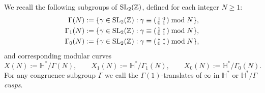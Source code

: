 \documentclass[11pt]{article}
\renewcommand{\H}{\mathbb{H}}
\newcommand{\Z}{\mathbb{Z}}
\newcommand{\SL}{{\rm SL}}
\theoremstyle{definition}
\begin{document}
We recall the following subgroups of $\SL_2(\Z)$, defined for each integer $N\ge 1$:
\begin{align*}
\Gamma(N)&:=\{\gamma\in \SL_2(\Z):\gamma\equiv \left(\begin{smallmatrix}1&0\\0&1\end{smallmatrix}\right)\bmod N\},\\
\Gamma_1(N)&:=\{\gamma\in \SL_2(\Z):\gamma\equiv \left(\begin{smallmatrix}1&*\\0&1\end{smallmatrix}\right)\bmod N\},\\
\Gamma_0(N)&:=\{\gamma\in \SL_2(\Z):\gamma\equiv \left(\begin{smallmatrix}*&*\\0&*\end{smallmatrix}\right)\bmod N\},
\end{align*}
and corresponding modular curves
\[
X(N):=\H^*/\Gamma(N),\qquad X_1(N):=\H^*/\Gamma_1(N),\qquad X_0(N):=\H^*/\Gamma_0(N).
\]
For any congruence subgroup $\Gamma$ we call the $\Gamma(1)$-translates of $\infty$ in $\H^*$ or $\H^*/\Gamma$ \emph{cusps}.
\end{document}
